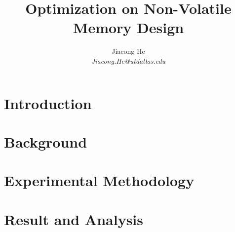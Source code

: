 \documentclass[pageno]{jpaper}
\begin{document}
\title{Optimization on Non-Volatile Memory Design}


\author {
	Jiacong He\\
       	\em Jiacong.He@utdallas.edu 
} 

\date{}
\maketitle

\thispagestyle{empty}

\begin{abstract}

\end{abstract}

\section{Introduction}
\label{sec:intro}


\section{Background}
\label{sec:background}


%


%

%

\section{Experimental Methodology}
\label{sec:experimental_methodology}



\section{Result and Analysis}
\label{sec:result}

\end{document}

